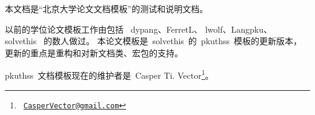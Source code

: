 
本文档是“北京大学论文文档模板”的测试和说明文档。

以前的学位论文模板工作由包括~%
dypang\supercite{dypang}、FerretL\supercite{FerretL}、
lwolf\supercite{lwolf}、Langpku\supercite{Langpku}、
solvethis\supercite{solvethis}~%
的数人做过。
本论文模板是~solvethis~的~pkuthss~模板的更新版本，
更新的重点是重构和对新文档类、宏包的支持。

pkuthss~文档模板现在的维护者是~Casper Ti. Vector\footnote%
{\ \href{CasperVector@gmail.com}{\texttt{CasperVector@gmail.com}}}。

